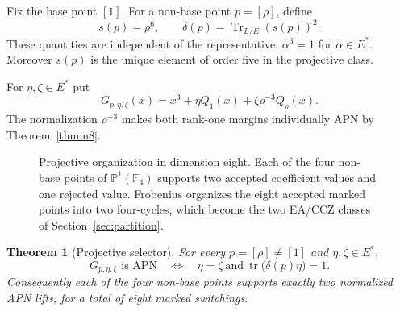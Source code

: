\documentclass[pdflatex,sn-mathphys-num]{sn-jnl}
\theoremstyle{thmstyleone}
\newtheorem{theorem}{Theorem}[section]
\theoremstyle{thmstyletwo}
\theoremstyle{thmstylethree}
\newcommand{\F}{\mathbb F}
\newcommand{\Tr}{\operatorname{Tr}}
\newcommand{\tr}{\operatorname{tr}}
\begin{document}
Fix the base point $[1]$.  For a non-base point $p=[\rho]$, define
\begin{equation}\label{eq:sdelta}
 s(p)=\rho^6,
 \qquad
 \delta(p)=\Tr_{L/E}(s(p))^2.
\end{equation}
These quantities are independent of the representative: $\alpha^3=1$ for $\alpha\in E^*$.  Moreover $s(p)$ is the unique element of order five in the projective class.

For $\eta,\zeta\in E^*$ put
\begin{equation}\label{eq:ranktwo}
 G_{p,\eta,\zeta}(x)
 =x^3+\eta Q_1(x)+\zeta\rho^{-3}Q_\rho(x).
\end{equation}
The normalization $\rho^{-3}$ makes both rank-one margins individually APN by Theorem~\ref{thm:n8}.

\begin{figure}[ht]
\centering
{}
\caption{Projective organization in dimension eight. Each of the four non-base points of $\mathbb P^1(\F_4)$ supports two accepted coefficient values and one rejected value. Frobenius organizes the eight accepted marked points into two four-cycles, which become the two EA/CCZ classes of Section~\ref{sec:partition}.}
\label{fig:projective-selector}
\end{figure}

\begin{theorem}[Projective selector]\label{thm:projective}
For every $p=[\rho]\ne[1]$ and $\eta,\zeta\in E^*$,
\begin{equation}\label{eq:projective-selector}
 G_{p,\eta,\zeta}\text{ is APN}
 \quad\Longleftrightarrow\quad
 \eta=\zeta
 \ \text{and}\ 
 \tr\bigl(\delta(p)\eta\bigr)=1.
\end{equation}
Consequently each of the four non-base points supports exactly two normalized APN lifts, for a total of eight marked switchings.
\end{theorem}
\end{document}
